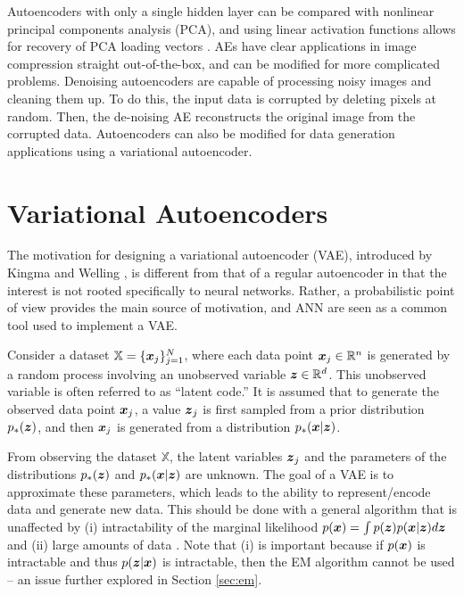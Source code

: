 Autoencoders with only a single hidden layer can be compared with nonlinear principal components analysis (PCA), and using linear activation functions allows for recovery of PCA loading vectors \cite{plaut2018}. AEs have clear applications in image compression straight out-of-the-box, and can be modified for more complicated problems. Denoising autoencoders \cite{vincent2008} are capable of processing noisy images and cleaning them up. To do this, the input data is corrupted by deleting pixels at random. Then, the de-noising AE reconstructs the original image from the corrupted data. Autoencoders can also be modified for data generation applications using a variational autoencoder.

\section{Variational Autoencoders}


The motivation for designing a variational autoencoder (VAE), introduced by Kingma and Welling \cite{kingma2014}, is different from that of a regular autoencoder in that the interest is not rooted specifically to neural networks. Rather, a probabilistic point of view provides the main source of motivation, and ANN are seen as a common tool used to implement a VAE.

Consider a dataset $\mathbb{X} = \{\boldsymbol{x}_j\}_{j=1}^N$, where each data point $\boldsymbol{x}_j \in \mathbb{R}^n$ is generated by a random process involving an unobserved variable $\boldsymbol{z} \in \mathbb{R}^d$. This unobserved variable is often referred to as ``latent code.'' It is assumed that to generate the observed data point $\boldsymbol{x}_j$, a value $\boldsymbol{z}_j$ is first sampled from a prior distribution $p_*(\boldsymbol{z})$, and then $\boldsymbol{x}_j$ is generated from a distribution $p_*(\boldsymbol{x} | \boldsymbol{z})$.

From observing the dataset $\mathbb{X}$, the latent variables $\boldsymbol{z}_j$ and the parameters of the distributions $p_*(\boldsymbol{z})$ and $p_*(\boldsymbol{x} | \boldsymbol{z})$ are unknown. The goal of a VAE is to approximate these parameters, which leads to the ability to represent/encode data and generate new data. This should be done with a general algorithm that is unaffected by (i) intractability of the marginal likelihood $p(\boldsymbol{x}) = \int p(\boldsymbol{z}) p(\boldsymbol{x} | \boldsymbol{z}) d\boldsymbol{z}$ and (ii) large amounts of data \cite{kingma2014}. Note that (i) is important because if $p(\boldsymbol{x})$ is intractable and thus $p(\boldsymbol{z} | \boldsymbol{x})$ is intractable, then the EM algorithm cannot be used -- an issue further explored in Section \ref{sec:em}.

